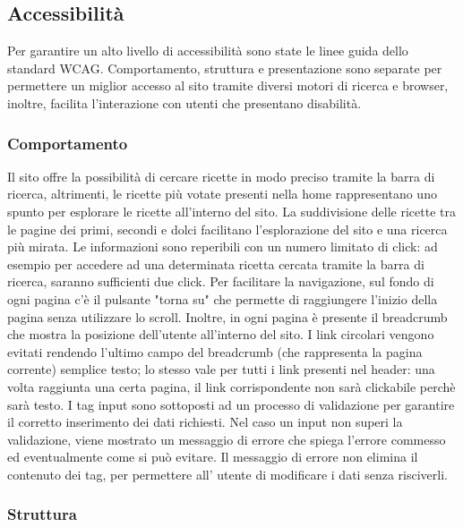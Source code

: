 \subsection{Accessibilità}
\label{sub:accessibilità}
Per garantire un alto livello di accessibilità sono state le linee guida dello standard WCAG. Comportamento, struttura e presentazione sono separate per permettere un miglior accesso al sito tramite diversi motori di ricerca e browser, inoltre, facilita l'interazione con utenti che presentano disabilità.

\subsubsection{Comportamento}
Il sito offre la possibilità di cercare ricette in modo preciso tramite la barra di ricerca, altrimenti, le ricette più votate presenti nella home rappresentano uno spunto per esplorare le ricette all'interno del sito. La suddivisione delle ricette tra le pagine dei primi, secondi e dolci facilitano l'esplorazione del sito e una ricerca più mirata. Le informazioni sono reperibili con un numero limitato di click: ad esempio per accedere ad una determinata ricetta cercata tramite la barra di ricerca, saranno sufficienti due click.
Per facilitare la navigazione, sul fondo di ogni pagina c'è il pulsante "torna su" che permette di raggiungere l'inizio della pagina senza utilizzare lo scroll. Inoltre, in ogni pagina è presente il breadcrumb che mostra la posizione dell'utente all'interno del sito. I link circolari vengono evitati rendendo l'ultimo campo del breadcrumb (che rappresenta la pagina corrente) semplice testo; lo stesso vale per tutti i link presenti nel header: una volta raggiunta una certa pagina, il link corrispondente non sarà clickabile perchè sarà testo.
I tag input sono sottoposti ad un processo di validazione per garantire il corretto inserimento dei dati richiesti. Nel caso un input non superi la validazione, viene mostrato un messaggio di errore che spiega l'errore commesso ed eventualmente come si può evitare. Il messaggio di errore non elimina il contenuto dei tag, per permettere all' utente di modificare i dati senza risciverli.

\subsubsection{Struttura}

